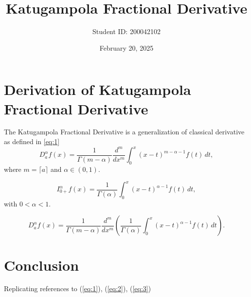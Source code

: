 \documentclass[a4paper,12pt]{article}
\title{Katugampola Fractional Derivative}
\author{Student ID: 200042102}
\date{February 20, 2025}
\begin{document}
	
	\maketitle
	
	\section{Derivation of Katugampola Fractional Derivative}
	The Katugampola Fractional Derivative is a generalization of classical derivative as defined in \autoref{eq:1}
	\begin{equation} \label{eq:1}
		D^\alpha_a f(x) = \frac{1}{\Gamma(m-\alpha)} \frac{d^m}{dx^m} \int_{0}^{x} (x-t)^{m-\alpha-1} f(t) \, dt,
	\end{equation}
	where $m=\lceil a \rceil$ and $\alpha \in (0,1)$.
	
	\begin{equation} \label{eq:2}
		I^\alpha_{0+} f(x) = \frac{1}{\Gamma(\alpha)} \int_{0}^{x} (x-t)^{\alpha-1} f(t) \, dt,
	\end{equation}
	with $0 < \alpha < 1$.
	
	\begin{equation} \label{eq:3}
		D^\alpha_a f(x) = \frac{1}{\Gamma(m-\alpha)} \frac{d^m}{dx^m} \left(\frac{1}{\Gamma(\alpha)} \int_{0}^{x} (x-t)^{\alpha-1} f(t) \, dt \right).
	\end{equation}
	
	\section{Conclusion}
	Replicating references to (\ref{eq:1}),  (\ref{eq:2}),  (\ref{eq:3})
	
\end{document}
